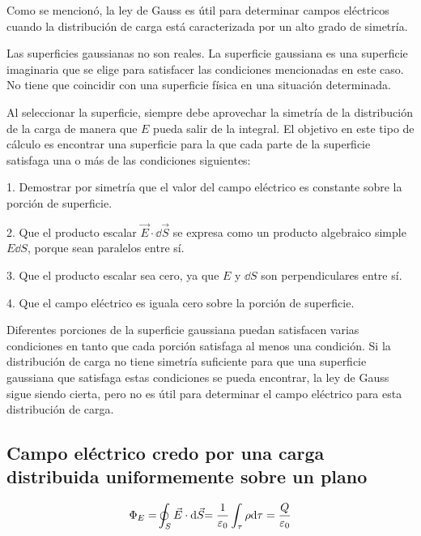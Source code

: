 \begin{miparrafodestacado}

Como se mencionó, la ley de Gauss es útil para determinar campos eléctricos cuando la distribución de carga está caracterizada por un alto grado de simetría.  

Las superficies gaussianas no son reales.  La superficie gaussiana es una superficie imaginaria que se elige para satisfacer las condiciones mencionadas en este caso. No tiene que coincidir con una superficie física en una situación determinada. 

Al seleccionar la superficie, siempre debe aprovechar la simetría de la distribución de la carga de manera que $E$ pueda salir de la integral. El objetivo en este tipo de cálculo es encontrar una superficie para la que cada parte de la superficie satisfaga una o más de las condiciones siguientes: 

1. Demostrar por simetría que el valor del campo eléctrico es constante sobre la porción de superficie.
 
2. Que el producto escalar $\vec E \cdot \dd \vec S$ se expresa como un producto algebraico simple $E \dd S$, porque sean paralelos entre sí. 

3. Que el producto escalar sea cero, ya que $E$ y $\dd S$ son  perpendiculares entre sí.
 
4. Que el campo eléctrico es iguala cero sobre la porción de superficie. 

Diferentes porciones de la superficie gaussiana puedan satisfacen varias condiciones en tanto que cada porción satisfaga al menos una condición.  Si la distribución de carga no tiene simetría suficiente para que una superficie gaussiana que satisfaga estas condiciones se pueda encontrar, la ley de Gauss sigue siendo cierta,  pero no es útil para determinar el campo eléctrico para esta distribución de carga. 	
\end{miparrafodestacado}


\subsection{Campo eléctrico credo por una carga distribuida uniformemente sobre un plano}

$$\displaystyle \displaystyle{ \Phi_E=} \oint_S \vec E \cdot \dd \vec S{ = \dfrac 1 {\varepsilon_0} \int_\tau \rho \dd \tau =\dfrac {Q}{\varepsilon_0}}$$

